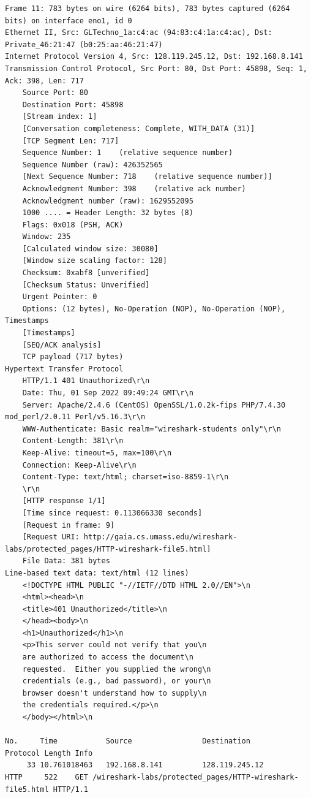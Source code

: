 \documentclass[a4paper,11pt,final]{report}
\begin{document}
\begin{lstlisting}[breaklines]
Frame 11: 783 bytes on wire (6264 bits), 783 bytes captured (6264 bits) on interface eno1, id 0
Ethernet II, Src: GLTechno_1a:c4:ac (94:83:c4:1a:c4:ac), Dst: Private_46:21:47 (b0:25:aa:46:21:47)
Internet Protocol Version 4, Src: 128.119.245.12, Dst: 192.168.8.141
Transmission Control Protocol, Src Port: 80, Dst Port: 45898, Seq: 1, Ack: 398, Len: 717
    Source Port: 80
    Destination Port: 45898
    [Stream index: 1]
    [Conversation completeness: Complete, WITH_DATA (31)]
    [TCP Segment Len: 717]
    Sequence Number: 1    (relative sequence number)
    Sequence Number (raw): 426352565
    [Next Sequence Number: 718    (relative sequence number)]
    Acknowledgment Number: 398    (relative ack number)
    Acknowledgment number (raw): 1629552095
    1000 .... = Header Length: 32 bytes (8)
    Flags: 0x018 (PSH, ACK)
    Window: 235
    [Calculated window size: 30080]
    [Window size scaling factor: 128]
    Checksum: 0xabf8 [unverified]
    [Checksum Status: Unverified]
    Urgent Pointer: 0
    Options: (12 bytes), No-Operation (NOP), No-Operation (NOP), Timestamps
    [Timestamps]
    [SEQ/ACK analysis]
    TCP payload (717 bytes)
Hypertext Transfer Protocol
    HTTP/1.1 401 Unauthorized\r\n
    Date: Thu, 01 Sep 2022 09:49:24 GMT\r\n
    Server: Apache/2.4.6 (CentOS) OpenSSL/1.0.2k-fips PHP/7.4.30 mod_perl/2.0.11 Perl/v5.16.3\r\n
    WWW-Authenticate: Basic realm="wireshark-students only"\r\n
    Content-Length: 381\r\n
    Keep-Alive: timeout=5, max=100\r\n
    Connection: Keep-Alive\r\n
    Content-Type: text/html; charset=iso-8859-1\r\n
    \r\n
    [HTTP response 1/1]
    [Time since request: 0.113066330 seconds]
    [Request in frame: 9]
    [Request URI: http://gaia.cs.umass.edu/wireshark-labs/protected_pages/HTTP-wireshark-file5.html]
    File Data: 381 bytes
Line-based text data: text/html (12 lines)
    <!DOCTYPE HTML PUBLIC "-//IETF//DTD HTML 2.0//EN">\n
    <html><head>\n
    <title>401 Unauthorized</title>\n
    </head><body>\n
    <h1>Unauthorized</h1>\n
    <p>This server could not verify that you\n
    are authorized to access the document\n
    requested.  Either you supplied the wrong\n
    credentials (e.g., bad password), or your\n
    browser doesn't understand how to supply\n
    the credentials required.</p>\n
    </body></html>\n

No.     Time           Source                Destination           Protocol Length Info
     33 10.761018463   192.168.8.141         128.119.245.12        HTTP     522    GET /wireshark-labs/protected_pages/HTTP-wireshark-file5.html HTTP/1.1 


\end{lstlisting}
\end{document}
